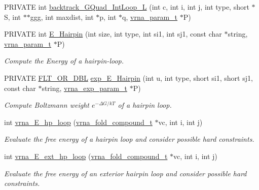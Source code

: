 \begin{DoxyCompactItemize}
\item 
P\-R\-I\-V\-A\-T\-E int \hyperlink{group__loops_ga7b371308fa5a45c7ac353ef6ed1014de}{backtrack\-\_\-\-G\-Quad\-\_\-\-Int\-Loop\-\_\-\-L} (int c, int i, int j, int type, short $\ast$S, int $\ast$$\ast$ggg, int maxdist, int $\ast$p, int $\ast$q, \hyperlink{group__energy__parameters_ga8a69ca7d787e4fd6079914f5343a1f35}{vrna\-\_\-param\-\_\-t} $\ast$P)
\item 
P\-R\-I\-V\-A\-T\-E int \hyperlink{group__loops_gadf943ee9a45b7f4cee9192c06210dace}{E\-\_\-\-Hairpin} (int size, int type, int si1, int sj1, const char $\ast$string, \hyperlink{group__energy__parameters_ga8a69ca7d787e4fd6079914f5343a1f35}{vrna\-\_\-param\-\_\-t} $\ast$P)
\begin{DoxyCompactList}\small\item\em Compute the Energy of a hairpin-\/loop. \end{DoxyCompactList}\item 
P\-R\-I\-V\-A\-T\-E \hyperlink{group__data__structures_ga31125aeace516926bf7f251f759b6126}{F\-L\-T\-\_\-\-O\-R\-\_\-\-D\-B\-L} \hyperlink{group__loops_ga51fb555974f180b78d76142b2894851c}{exp\-\_\-\-E\-\_\-\-Hairpin} (int u, int type, short si1, short sj1, const char $\ast$string, \hyperlink{group__energy__parameters_ga01d8b92fe734df8d79a6169482c7d8d8}{vrna\-\_\-exp\-\_\-param\-\_\-t} $\ast$P)
\begin{DoxyCompactList}\small\item\em Compute Boltzmann weight $e^{-\Delta G/kT} $ of a hairpin loop. \end{DoxyCompactList}\item 
int \hyperlink{group__loops_ga999ba163a8148d72fd5f22819a681df7}{vrna\-\_\-\-E\-\_\-hp\-\_\-loop} (\hyperlink{group__fold__compound_ga1b0cef17fd40466cef5968eaeeff6166}{vrna\-\_\-fold\-\_\-compound\-\_\-t} $\ast$vc, int i, int j)
\begin{DoxyCompactList}\small\item\em Evaluate the free energy of a hairpin loop and consider possible hard constraints. \end{DoxyCompactList}\item 
int \hyperlink{group__loops_gac3393ee309372eccae944e3a07f455f9}{vrna\-\_\-\-E\-\_\-ext\-\_\-hp\-\_\-loop} (\hyperlink{group__fold__compound_ga1b0cef17fd40466cef5968eaeeff6166}{vrna\-\_\-fold\-\_\-compound\-\_\-t} $\ast$vc, int i, int j)
\begin{DoxyCompactList}\small\item\em Evaluate the free energy of an exterior hairpin loop and consider possible hard constraints. \end{DoxyCompactList}\item 
$$
\end{DoxyCompactItemize}
